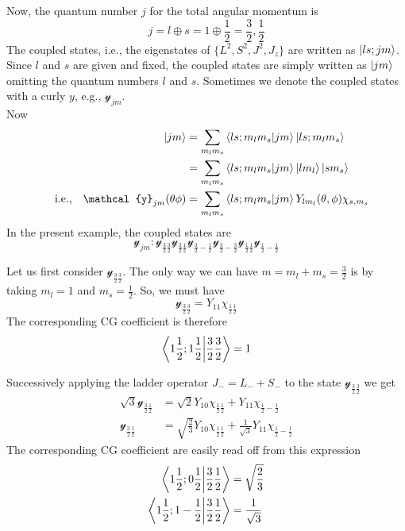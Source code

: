 
Now, the quantum number $j$ for the total angular momentum is
\begin{equation}
j = l \oplus s = 1 \oplus \frac{1}{2} = \frac{3}{2}, \frac{1}{2}
\end{equation}
The coupled states, i.e., the eigenstates of $\{L^2, S^2, J^2, J_z\}$ are written as $\ket{l s; j m}$. Since $l$ and $s$ are given and fixed, the coupled states are simply written as $\ket{j m}$ omitting the quantum numbers $l$ and $s$. Sometimes we denote the coupled states with a curly $y$, e.g., $\mathcal{y}_{j m}$.\\

Now
\begin{align*}
\ket{j m} &= \sum_{m_l m_s} \braket{l s; m_l m_s}{j m} \ket{l s; m_l m_s} \\
&= \sum_{m_l m_s} \braket{l s; m_l m_s}{j m} \ket{l m_l}\ket{s m_s} \\
\qq{i.e.,}\mathcal{y}_{j m}\qty(\theta\phi) &= \sum_{m_l m_s} \braket{l s; m_l m_s}{j m} Y_{l m_l}\qty(\theta, \phi) \chi_{s,m_s}
\end{align*}
In the present example, the coupled states are
\begin{equation}
\mathcal{y}_{j m} :
\mathcal{y}_{\frac{3}{2}\frac{3}{2}}
\mathcal{y}_{\frac{3}{2}\frac{1}{2}}
\mathcal{y}_{\frac{3}{2}-\frac{1}{2}}
\mathcal{y}_{\frac{3}{2}-\frac{3}{2}}
\mathcal{y}_{\frac{1}{2}\frac{1}{2}}
\mathcal{y}_{\frac{1}{2}-\frac{1}{2}}
\end{equation}

Let us first consider $\mathcal{y}_{\frac{3}{2}\frac{3}{2}}$. The only way we can have $m=m_l + m_s = \frac{3}{2}$ is by taking $m_l= 1$ and $m_s = \frac{1}{2}$. So, we must have
\begin{equation}
\label{chapter19.eqn1-spin-orbit}
\mathcal{y}_{\frac{3}{2}\frac{3}{2}} = Y_{1 1}\chi_{\frac{1}{2}\frac{1}{2}}
\end{equation}
The corresponding CG coefficient is therefore
\begin{equation*}
\braket{1 \frac{1}{2};1 \frac{1}{2}}{\frac{3}{2}\frac{3}{2}} = 1
\end{equation*}

Successively applying the ladder operator $J_{-} = L_{-} + S_{-}$ to the state $\mathcal{y}_{\frac{3}{2}\frac{3}{2}}$ we get
\begin{align}
\sqrt{3} \mathcal{y}_{\frac{3}{2}\frac{1}{2}} 
&= \sqrt{2} Y_{1 0}\chi_{\frac{1}{2}\frac{1}{2}} + Y_{1 1}\chi_{\frac{1}{2}-\frac{1}{2}} \nonumber\\
\label{chapter19.eqn2-spin-orbit}
\mathcal{y}_{\frac{3}{2}\frac{1}{2}} 
&= \sqrt{\frac{2}{3}} Y_{1 0}\chi_{\frac{1}{2}\frac{1}{2}} 
+
\frac{1}{\sqrt{3}} Y_{1 1}\chi_{\frac{1}{2}-\frac{1}{2}} \nonumber
\end{align}
The corresponding CG coefficient are easily read off from this expression
\begin{align*}
\braket{1 \frac{1}{2}; 0 \frac{1}{2}}{\frac{3}{2}\frac{1}{2}} &= \sqrt{\frac{2}{3}} \\
\braket{1 \frac{1}{2}; 1 -\frac{1}{2}}{\frac{3}{2}\frac{1}{2}} &= \frac{1}{\sqrt{3}}
\end{align*}

